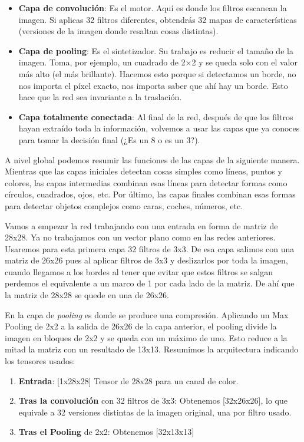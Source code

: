 \documentclass[a4paper,11pt]{article}
\begin{document}
\begin{itemize}
\item
  \textbf{Capa de convolución}: Es el motor. Aquí es donde los filtros
  escanean la imagen. Si aplicas 32 filtros diferentes, obtendrás 32
  mapas de características (versiones de la imagen donde resaltan cosas
  distintas).
\item
  \textbf{Capa de pooling}: Es el sintetizador. Su trabajo es reducir el
  tamaño de la imagen. Toma, por ejemplo, un cuadrado de 2×2 y se queda
  solo con el valor más alto (el más brillante). Hacemos esto porque si
  detectamos un borde, no nos importa el píxel exacto, nos importa saber
  que ahí hay un borde. Esto hace que la red sea invariante a la
  traslación.
\item
  \textbf{Capa totalmente conectada}: Al final de la red, después de que
  los filtros hayan extraído toda la información, volvemos a usar las
  capas que ya conoces para tomar la decisión final (¿Es un 8 o es un
  3?).
\end{itemize}

A nivel global podemos resumir las funciones de las capas de la
siguiente manera. Mientras que las capas iniciales detectan cosas
simples como líneas, puntos y colores, las capas intermedias combinan
esas líneas para detectar formas como círculos, cuadrados, ojos, etc.
Por último, las capas finales combinan esas formas para detectar objetos
complejos como caras, coches, números, etc.

Vamos a empezar la red trabajando con una entrada en forma de matriz de
28x28. Ya no trabajamos con un vector plano como en las redes
anteriores. Usaremos para esta primera capa 32 filtros de 3x3. De esa
capa salimos con una matriz de 26x26 pues al aplicar filtros de 3x3 y
deslizarlos por toda la imagen, cuando llegamos a los bordes al tener
que evitar que estos filtros se salgan perdemos el equivalente a un
marco de 1 por cada lado de la matriz. De ahí que la matriz de 28x28 se
quede en una de 26x26.

En la capa de \emph{pooling} es donde se produce una compresión.
Aplicando un Max Pooling de 2x2 a la salida de 26x26 de la capa
anterior, el pooling divide la imagen en bloques de 2x2 y se queda con
un máximo de uno. Esto reduce a la mitad la matriz con un resultado de
13x13. Resumimos la arquitectura indicando los tensores usados:

\begin{enumerate}
\def\labelenumi{\arabic{enumi}.}
\item
  \textbf{Entrada}: {[}1x28x28{]} Tensor de 28x28 para un canal de
  color.
\item
  \textbf{Tras la convolución} con 32 filtros de 3x3: Obtenemos
  {[}32x26x26{]}, lo que equivale a 32 versiones distintas de la imagen
  original, una por filtro usado.
\item
  \textbf{Tras el Pooling} de 2x2: Obtenemos {[}32x13x13{]}
\end{enumerate}
\end{document}
